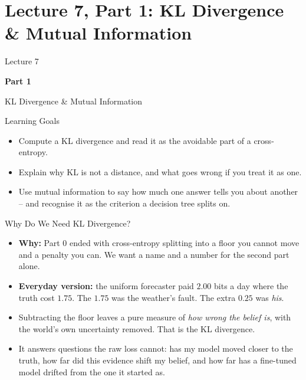 \section{Lecture 7, Part 1: KL Divergence \& Mutual Information}

\begin{frame}
\vfill
\centering
{\color{RLBlue}\large Lecture 7}

\vspace{0.3em}
{\color{RLBlue}\Large\bfseries Part 1}

\vspace{0.6em}
{\Large KL Divergence \& Mutual Information}
\vfill
\end{frame}

\begin{frame}{Learning Goals}
\begin{itemize}
  \item Compute a KL divergence and read it as the avoidable part of a cross-entropy.
  \pause
  \item Explain why KL is not a distance, and what goes wrong if you treat it as one.
  \pause
  \item Use mutual information to say how much one answer tells you about another -- and recognise it as the criterion a decision tree splits on.
\end{itemize}
\end{frame}

\begin{frame}{Why Do We Need KL Divergence?}
\begin{itemize}
  \item \textbf{Why:} Part 0 ended with cross-entropy splitting into a floor you cannot move and a penalty you can. We want a name and a number for the second part alone.
  \pause
  \item \textbf{Everyday version:} the uniform forecaster paid $2.00$ bits a day where the truth cost $1.75$. The $1.75$ was the weather's fault. The extra $0.25$ was \emph{his}.
  \pause
  \item Subtracting the floor leaves a pure measure of \emph{how wrong the belief is}, with the world's own uncertainty removed. That is the KL divergence.
  \pause
  \item It answers questions the raw loss cannot: has my model moved closer to the truth, how far did this evidence shift my belief, and how far has a fine-tuned model drifted from the one it started as.
\end{itemize}
\end{frame}

